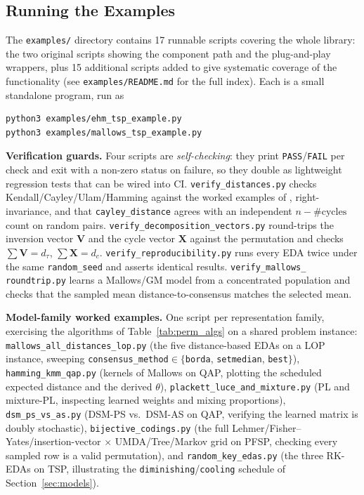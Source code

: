 \documentclass[a4paper,11pt]{article}
\begin{document}
\subsection{Running the Examples}
\label{sec:examples}

The \texttt{examples/} directory contains 17 runnable scripts covering the whole
library: the two original scripts showing the component path and the
plug-and-play wrappers, plus 15 additional scripts added to give systematic
coverage of the functionality (see \texttt{examples/README.md} for the full
index). Each is a small standalone program, run as

\begin{lstlisting}[language=bash]
python3 examples/ehm_tsp_example.py
python3 examples/mallows_tsp_example.py
\end{lstlisting}

\noindent \textbf{Verification guards.} Four scripts are \emph{self-checking}:
they print \texttt{PASS}/\texttt{FAIL} per check and exit with a non-zero status
on failure, so they double as lightweight regression tests that can be wired
into CI. \texttt{verify\_distances.py} checks Kendall/Cayley/Ulam/Hamming
against the worked examples of \cite{Ceberio_et_al:2011}, right-invariance, and
that \texttt{cayley\_distance} agrees with an independent $n-\#\mathrm{cycles}$
count on random pairs. \texttt{verify\_decomposition\_vectors.py} round-trips
the inversion vector $\mathbf{V}$ and the cycle vector $\mathbf{X}$ against the
permutation and checks $\sum \mathbf{V} = d_\tau$, $\sum \mathbf{X} = d_c$.
\texttt{verify\_reproducibility.py} runs every EDA twice under the same
\texttt{random\_seed} and asserts identical results. \texttt{verify\_mallows\_
roundtrip.py} learns a Mallows/GM model from a concentrated population and
checks that the sampled mean distance-to-consensus matches the selected mean.

\noindent \textbf{Model-family worked examples.} One script per representation
family, exercising the algorithms of Table~\ref{tab:perm_algs} on a shared
problem instance: \texttt{mallows\_all\_distances\_lop.py} (the five
distance-based EDAs on a LOP instance, sweeping
\texttt{consensus\_method}$\in\{$\texttt{borda}, \texttt{setmedian},
\texttt{best}$\}$), \texttt{hamming\_kmm\_qap.py} (kernels of Mallows on QAP,
plotting the scheduled expected distance and the derived $\theta$),
\texttt{plackett\_luce\_and\_mixture.py} (PL and mixture-PL, inspecting learned
weights and mixing proportions), \texttt{dsm\_ps\_vs\_as.py} (DSM-PS vs.\
DSM-AS on QAP, verifying the learned matrix is doubly stochastic),
\texttt{bijective\_codings.py} (the full Lehmer/Fisher--Yates/insertion-vector
$\times$ UMDA/Tree/Markov grid on PFSP, checking every sampled row is a valid
permutation), and \texttt{random\_key\_edas.py} (the three RK-EDAs on TSP,
illustrating the \texttt{diminishing}/\texttt{cooling} schedule of
Section~\ref{sec:models}).
\end{document}
